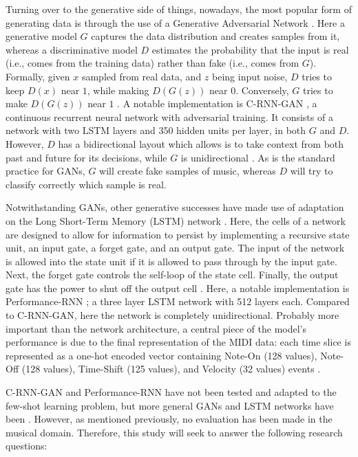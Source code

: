 \documentclass[a4paper]{book}
\begin{document}
Turning over to the generative side of things, nowadays, the most popular form of generating data is through the use of a Generative Adversarial Network \parencite[GAN;][]{goodfellow_generative_2014}. Here a generative model $G$ captures the data distribution and creates samples from it, whereas a discriminative model $D$ estimates the probability that the input is real (i.e., comes from the training data) rather than fake (i.e., comes from $G$). Formally, given $x$ sampled from real data, and $z$ being input noise, $D$ tries to keep $D(x)$ near $1$, while making $D(G(z))$ near $0$. Conversely, $G$ tries to make $D(G(z))$ near $1$ \parencite{goodfellow_nips_2016}. A notable implementation is C-RNN-GAN \parencite{mogren_c-rnn-gan_2016}, a continuous recurrent neural network with adversarial training. It consists of a network with two LSTM layers and 350 hidden units per layer, in both $G$ and $D$. However, $D$ has a bidirectional layout which allows is to take context from both past and future for its decisions, while $G$ is unidirectional \parencite{mogren_c-rnn-gan_2016}. As is the standard practice for GANs, $G$ will create fake samples of music, whereas $D$ will try to classify correctly which sample is real.

Notwithstanding GANs, other generative successes have made use of adaptation on the Long Short-Term Memory (LSTM) network \parencite{hochreiter_long_1997}. Here, the cells of a network are designed to allow for information to persist by implementing a recursive state unit, an input gate, a forget gate, and an output gate. The input of the network is allowed into the state unit if it is allowed to pass through by the input gate. Next, the forget gate controls the self-loop of the state cell. Finally, the output gate has the power to shut off the output cell \parencite{goodfellow_deep_2016}. Here, a notable implementation is Performance-RNN \parencite{oore_this_2018}; a three layer LSTM network with 512 layers each. Compared to C-RNN-GAN, here the network is completely unidirectional. Probably more important than the network architecture, a central piece of the model's performance is due to the final representation of the MIDI data: each time slice is represented as a one-hot encoded vector containing Note-On (128 values), Note-Off (128 values), Time-Shift (125 values), and Velocity (32 values) events \parencite{oore_this_2018}. 

C-RNN-GAN and Performance-RNN have not been tested and adapted to the few-shot learning problem, but more general GANs and LSTM networks have been \parencite[see][]{zhang_metagan_2018, vinyals_matching_2016}. However, as mentioned previously, no evaluation has been made in the musical domain. Therefore, this study will seek to answer the following research questions:
\end{document}
